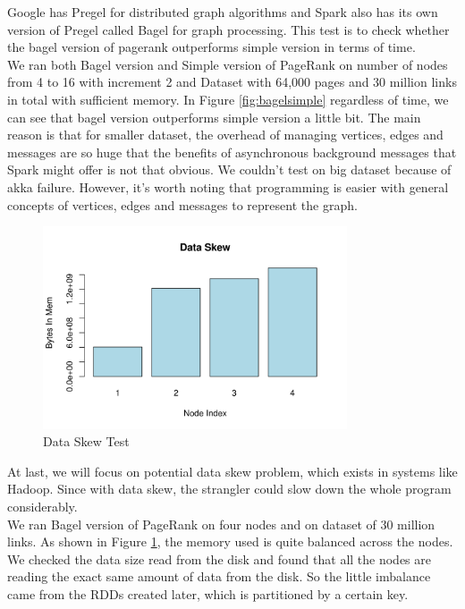 \documentclass{article}
\begin{document}
Google has Pregel for distributed graph algorithms and Spark also has its own version of Pregel called Bagel for graph processing. This test is to check whether the bagel version of pagerank outperforms simple version in terms of time.\\

We ran both Bagel version and Simple version of PageRank on number of nodes from 4 to 16 with increment 2 and Dataset with 64,000 pages and 30 million links in total with sufficient memory. In Figure \ref{fig:bagelsimple} regardless of time, we can see that bagel version outperforms simple version a little bit. The main reason is that for smaller dataset, the overhead of managing vertices, edges and messages are so huge that the benefits of asynchronous background messages that Spark might offer is not that obvious. We couldn’t test on big dataset because of akka failure. However, it’s worth noting that programming is easier with general concepts of vertices, edges and messages to represent the graph.\\

\begin{figure}[H]
        \centering
        \includegraphics[width=90mm]{images/skew.png}
        \caption{Data Skew Test}
        \label{fig:dataskew}
    \end{figure}

At last, we will focus on potential data skew problem, which exists in systems like Hadoop. Since with data skew, the strangler could slow down the whole program considerably.\\

We ran Bagel version of PageRank on four nodes and on dataset of 30 million links. As shown in Figure \ref{fig:dataskew}, the memory used is quite balanced across the nodes. We checked the data size read from the disk and found that all the nodes are reading the exact same amount of data from the disk. So the little imbalance came from the RDDs created later, which is partitioned by a certain key. \\
\end{document}

